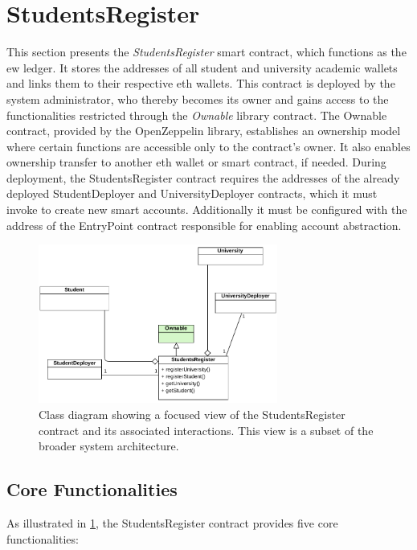 \section{StudentsRegister}
This section presents the \textit{StudentsRegister} smart contract, which functions as the \gls{ew} ledger. It stores the addresses of all student and university academic wallets and links them to their respective \gls{eth} wallets. This contract is deployed by the system administrator, who thereby becomes its owner and gains access to the functionalities restricted through the \textit{Ownable} library contract. The Ownable contract, provided by the OpenZeppelin library, establishes an ownership model where certain functions are accessible only to the contract's owner. It also enables ownership transfer to another \gls{eth} wallet or smart contract, if needed.
During deployment, the StudentsRegister contract requires the addresses of the already deployed StudentDeployer and UniversityDeployer contracts, which it must invoke to create new smart accounts. Additionally it must be configured with the address of the EntryPoint contract responsible for enabling account abstraction.
\begin{figure}
  \centering
  \includegraphics[width=0.7\textwidth]{figures/StudentsRegister class diagram.pdf}
  \caption[Class diagram focused on StudentsRegister contract]{Class diagram showing a focused view of the StudentsRegister contract and its associated interactions. This view is a subset of the broader system architecture.}
  \label{fig:studentsRegisterContractClass}
\end{figure}

\subsection{Core Functionalities}
As illustrated in \cref{fig:studentsRegisterContractClass}, the StudentsRegister contract provides five core functionalities:

